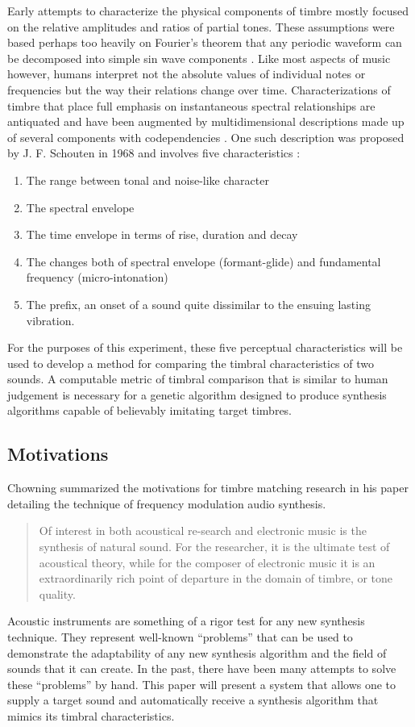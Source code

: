 \documentclass[12pt]{article}
\begin{document}
Early attempts to characterize the physical components of timbre mostly focused on the relative amplitudes and ratios of partial tones. These assumptions were based perhaps too heavily on Fourier's theorem that any periodic waveform can be decomposed into simple sin wave components \citep{helmholtz1857physiological, helmholtz1954sensations}. Like most aspects of music however, humans interpret not the absolute values of individual notes or frequencies but the way their relations change over time. Characterizations of timbre that place full emphasis on instantaneous spectral relationships are antiquated and have been augmented by multidimensional descriptions made up of several components with codependencies \citep{erickson1975sound}. One such description was proposed by J. F. Schouten in 1968 and involves five characteristics \citep{schouten1968perception, erickson1975sound}:
\begin{enumerate}
\item
The range between tonal and noise-like character
\item
The spectral envelope
\item
The time envelope in terms of rise, duration and decay
\item
The changes both of spectral envelope (formant-glide) and fundamental frequency (micro-intonation)
\item
The prefix, an onset of a sound quite dissimilar to the ensuing lasting vibration.
\end{enumerate}

For the purposes of this experiment, these five perceptual characteristics will be used to develop a method for comparing the timbral characteristics of two sounds. A computable metric of timbral comparison that is similar to human judgement is necessary for a genetic algorithm designed to produce synthesis algorithms capable of believably imitating target timbres.



\subsection{Motivations}\label{TMMOTIVATION}
Chowning summarized the motivations for timbre matching research in his paper detailing the technique of frequency modulation audio synthesis.
\begin{quote}
Of interest in both acoustical re-search and electronic music is the synthesis of natural sound. For the researcher, it is the ultimate test of acoustical theory, while for the composer of electronic music it is an extraordinarily rich point of departure in the domain of timbre, or tone quality. \citep{chowning1973synthesis}
\end{quote}
Acoustic instruments are something of a rigor test for any new synthesis technique. They represent well-known ``problems'' that can be used to demonstrate the adaptability of any new synthesis algorithm and the field of sounds that it can create. In the past, there have been many attempts to solve these ``problems'' by hand. This paper will present a system that allows one to supply a target sound and automatically receive a synthesis algorithm that mimics its timbral characteristics.
	
\end{document}
